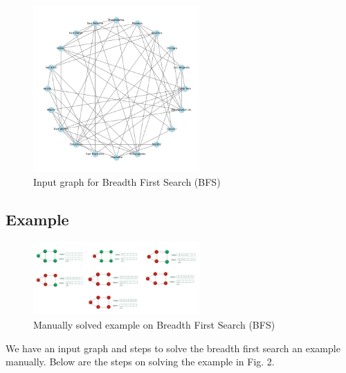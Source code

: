 \documentclass[lettersize,journal]{IEEEtran}
\begin{document}
\begin{figure}[!t]
\centering
\includegraphics[width=2.5in]{plot_bfs.png}
\caption{Input graph for Breadth First Search (BFS)}
\label{fig_1}
\end{figure}

\subsection{Example}

\begin{figure}[!t]
\centering
\includegraphics[width=2.5in]{EX_BFS.jpeg}
\caption{Manually solved example on Breadth First Search (BFS) \cite{bfs_gfg}}
\label{fig_2}
\end{figure}

We have an input graph and steps to solve the breadth first search an example manually. Below are the steps on solving the example in Fig. 2.
\end{document}

